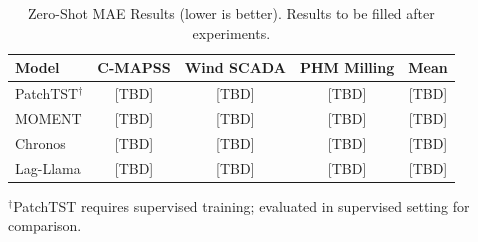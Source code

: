 \begin{table}[htbp]
\caption{Zero-Shot MAE Results (lower is better). Results to be filled after experiments.}
\label{tab:zero_shot_mae}
\centering
\begin{tabular}{lccc|c}
\toprule
Model & C-MAPSS & Wind SCADA & PHM Milling & Mean \\
\midrule
PatchTST$^{\dagger}$ & [TBD] & [TBD] & [TBD] & [TBD] \\
MOMENT & [TBD] & [TBD] & [TBD] & [TBD] \\
Chronos & [TBD] & [TBD] & [TBD] & [TBD] \\
Lag-Llama & [TBD] & [TBD] & [TBD] & [TBD] \\
\bottomrule
\end{tabular}
\vspace{2pt}
\footnotesize{$^{\dagger}$PatchTST requires supervised training; evaluated in supervised setting for comparison.}
\end{table}
